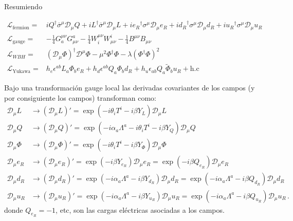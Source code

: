 \begin{frame}
Resumiendo

\begin{align}
  \label{eq:smscalar}
\mathcal{L}_{\text{fermion}}=&i{Q}^{\dagger}\overline{\sigma}^\mu\mathcal{D}_\mu Q+i{L}^{\dagger}\overline{\sigma}^\mu\mathcal{D}_\mu L+
i{e_R}^{\dagger}\sigma^\mu\mathcal{D}_\mu {e_R}+i{d_R}^{\dagger}\sigma^\mu\mathcal{D}_\mu {d_R}+i{u_R}^{\dagger}\sigma^\mu\mathcal{D}_\mu {u_R}\nonumber\\
\mathcal{L}_{\text{gauge}}=& -\tfrac{1}{4}G^{\mu\nu}_a G_{\mu\nu}^a-\tfrac{1}{4}W^{\mu\nu}_i W_{\mu\nu}^i-\tfrac{1}{4}B^{\mu\nu} B_{\mu\nu}\nonumber\\
  \mathcal{L}_{WBH}=&(\mathcal{D}_\mu\Phi)^\dagger\mathcal{D}^\mu\Phi-\mu^2\Phi^\dagger\Phi-\lambda(\Phi^\dagger\Phi)^2\nonumber\\
\mathcal{L}_{\text{Yukawa}}=&h_e \epsilon^{ab}L_a\Phi_b e_R+h_d \epsilon^{ab}Q_a\Phi_b d_R+h_u \epsilon_{ab}Q_a\widetilde{\Phi}_{b}u_R+\text{h.c}
\end{align}


Bajo una transformación gauge local las derivadas covariantes de los campos (y por consiguiente los campos) transforman como:
\begin{align}
  \mathcal{D}_\mu L&\to\left(\mathcal{D}_\mu L\right)'=\exp\left(-i\theta_iT^i-i\beta Y_L\right)\mathcal{D}_\mu L\nonumber\\
  \mathcal{D}_\mu Q&\to\left(\mathcal{D}_\mu Q\right)'=\exp\left(-i\alpha_a\Lambda^a-i\theta_iT^i-i\beta Y_Q\right)\mathcal{D}_\mu Q\nonumber\\
  \mathcal{D}_\mu \Phi&\to\left(\mathcal{D}_\mu \Phi\right)'=\exp\left(-i\theta_iT^i-i\beta Y_\Phi\right)\mathcal{D}_\mu \Phi\nonumber\\
  \mathcal{D}_\mu e_R&\to\left(\mathcal{D}_\mu e_R\right)'=\exp\left(-i\beta Y_{e_R}\right)\mathcal{D}_\mu e_R=\exp\left(-i\beta Q_{e_R}\right)\mathcal{D}_\mu e_R\nonumber\\
  \mathcal{D}_\mu d_R&\to\left(\mathcal{D}_\mu d_R\right)'=\exp\left(-i\alpha_a\Lambda^a-i\beta Y_{d_R}\right)\mathcal{D}_\mu d_R=\exp\left(-i\alpha_a\Lambda^a-i\beta Q_{d_R}\right)\mathcal{D}_\mu d_R\nonumber\\
  \mathcal{D}_\mu u_R&\to\left(\mathcal{D}_\mu u_R\right)'=\exp\left(-i\alpha_a\Lambda^a-i\beta Y_{u_R}\right)\mathcal{D}_\mu u_R=\exp\left(-i\alpha_a\Lambda^a-i\beta Q_{u_R}\right)\mathcal{D}_\mu u_R\,.
\end{align}
donde $Q_{e_R}=-1$, etc, son las cargas eléctricas asociadas a los campos.



\end{frame}
